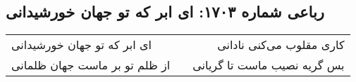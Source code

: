 \begin{center}
\section*{رباعی شماره ۱۷۰۳: ای ابر که تو جهان خورشیدانی}
\label{sec:1703}
\begin{longtable}{l p{0.5cm} r}
ای ابر که تو جهان خورشیدانی
&&
کاری مقلوب می‌کنی نادانی
\\
از ظلم تو بر ماست جهان ظلمانی
&&
بس گریه نصیب ماست تا گریانی
\\
\end{longtable}
\end{center}
